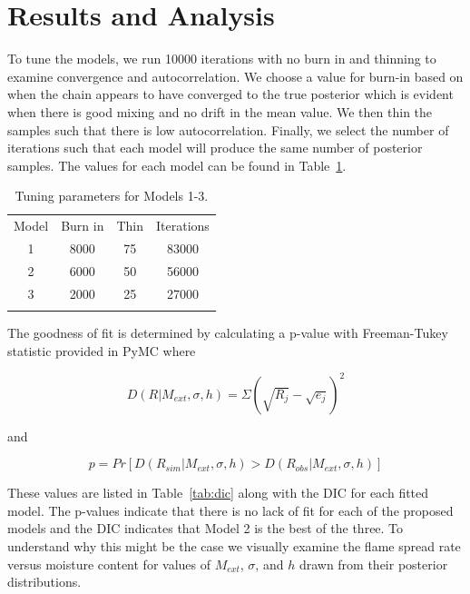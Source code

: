 \documentclass[11pt]{article}
\begin{document}
\section{Results and Analysis}
\label{sec:res}

To tune the models, we run 10000 iterations with no burn in and thinning to examine convergence and autocorrelation. We choose a value for burn-in based on when the chain appears to have converged to the true posterior which is evident when there is good mixing and no drift in the mean value. We then thin the samples such that there is low autocorrelation. Finally, we select the number of iterations such that each model will produce the same number of posterior samples. The values for each model can be found in Table~\ref{tab:tune}.

\begin{table}[h]
\caption{Tuning parameters for Models 1-3.}
\begin{center}
  \begin{tabular}{cccc}
    \hline\noalign{\smallskip}
    Model & Burn in & Thin & Iterations \\
    \noalign{\smallskip}\hline\noalign{\smallskip}
    1 & 8000 & 75 & 83000 \\
    2 & 6000 & 50 & 56000 \\ 
    3 & 2000 & 25 & 27000 \\ 
    \noalign{\smallskip}\hline
  \end{tabular}
\end{center}
\label{tab:tune}
\end{table}
\newpage
The goodness of fit is determined by calculating a p-value with Freeman-Tukey statistic \cite{brooks2000bayesian} provided in PyMC where  

\begin{equation}
D(R|M_{ext},\sigma,h) = \Sigma(\sqrt{R_j} - \sqrt{e_j})^2
\label{eq:D_val}
\end{equation}

\noindent and

\begin{equation}
p = Pr[D(R_{sim}|M_{ext},\sigma,h) > D(R_{obs}|M_{ext},\sigma,h)]
\label{eq:p_val}
\end{equation}

These values are listed in Table~\ref{tab:dic} along with the DIC for each fitted model. The p-values indicate that there is no lack of fit for each of the proposed models and the DIC indicates that Model 2 is the best of the three. To understand why this might be the case we visually examine the flame spread rate versus moisture content for values of $M_{ext}$, $\sigma$, and $h$ drawn from their posterior distributions.
\end{document}
